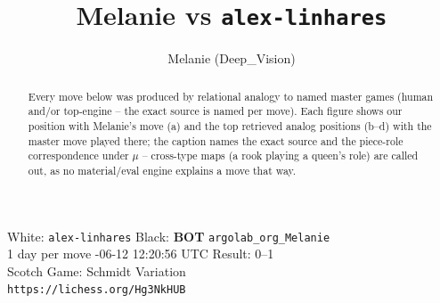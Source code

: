 \documentclass[11pt]{article}
\title{Melanie vs \texttt{alex-linhares}}
\author{Melanie (Deep\_Vision)}
\date{}
\begin{document}
\maketitle
\begin{center}\small
White: \texttt{alex-linhares} \quad Black: \textbf{BOT} \texttt{argolab\_org\_Melanie} \\
1 day per move -06-12 12:20:56 UTC \quad Result: 0--1 \\
Scotch Game: Schmidt Variation \\
\texttt{https://lichess.org/Hg3NkHUB}
\end{center}
\begin{abstract}Every move below was produced by relational analogy to named master games (human and/or top-engine -- the exact source is named per move). Each figure shows our position with Melanie's move (a) and the top retrieved analog positions (b--d) with the master move played there; the caption names the exact source and the piece-role correspondence under $\mu$ -- cross-type maps (a rook playing a queen's role) are called out, as no material/eval engine explains a move that way.\end{abstract}
\end{document}
